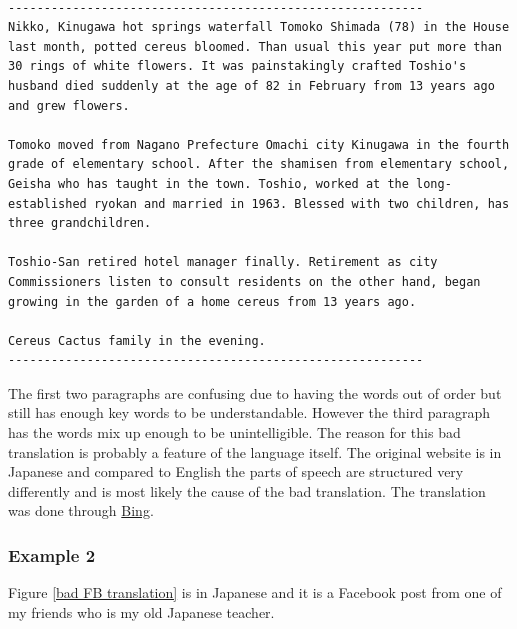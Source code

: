 \documentclass[letterpaper,12pt]{article}
\begin{document}
\begin{lstlisting}[breaklines]

----------------------------------------------------------
Nikko, Kinugawa hot springs waterfall Tomoko Shimada (78) in the House last month, potted cereus bloomed. Than usual this year put more than 30 rings of white flowers. It was painstakingly crafted Toshio's husband died suddenly at the age of 82 in February from 13 years ago and grew flowers.

Tomoko moved from Nagano Prefecture Omachi city Kinugawa in the fourth grade of elementary school. After the shamisen from elementary school, Geisha who has taught in the town. Toshio, worked at the long-established ryokan and married in 1963. Blessed with two children, has three grandchildren.

Toshio-San retired hotel manager finally. Retirement as city Commissioners listen to consult residents on the other hand, began growing in the garden of a home cereus from 13 years ago.

Cereus Cactus family in the evening.
----------------------------------------------------------
\end{lstlisting}

The first two paragraphs are confusing due to  having the words out of order but still has enough key words to be understandable. However the third paragraph has the words mix up enough to be unintelligible. The reason for this bad translation is probably a feature of the language itself. The original website is in Japanese and compared to English the parts of speech are structured very differently and is most likely the cause of the bad translation. The translation was done through \href{http://www.microsofttranslator.com/bv.aspx?to=en&r=true&a=http\%3A\%2F\%2Fwww.asahi.com\%2Farticles\%2FASK944SHKK94UUHB009.html\%3Fref\%3Dchiezou}{Bing}.

\subsubsection{Example 2}

Figure \ref{bad FB translation} is in Japanese and it is a Facebook post from one of my friends who is my old Japanese teacher.
\end{document}

